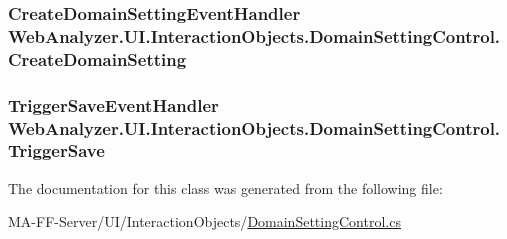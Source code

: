 \subsubsection[{Create\+Domain\+Setting}]{\setlength{\rightskip}{0pt plus 5cm}Create\+Domain\+Setting\+Event\+Handler Web\+Analyzer.\+U\+I.\+Interaction\+Objects.\+Domain\+Setting\+Control.\+Create\+Domain\+Setting}\label{class_web_analyzer_1_1_u_i_1_1_interaction_objects_1_1_domain_setting_control_aff18f63d7e7cb4b8c5d62b881bfc685c}
\hypertarget{class_web_analyzer_1_1_u_i_1_1_interaction_objects_1_1_domain_setting_control_a1daa9c774e823427b39110bc42ff0ccd}{}
\subsubsection[{Trigger\+Save}]{\setlength{\rightskip}{0pt plus 5cm}Trigger\+Save\+Event\+Handler Web\+Analyzer.\+U\+I.\+Interaction\+Objects.\+Domain\+Setting\+Control.\+Trigger\+Save}\label{class_web_analyzer_1_1_u_i_1_1_interaction_objects_1_1_domain_setting_control_a1daa9c774e823427b39110bc42ff0ccd}


The documentation for this class was generated from the following file\+:\begin{DoxyCompactItemize}
\item 
M\+A-\/\+F\+F-\/\+Server/\+U\+I/\+Interaction\+Objects/\hyperlink{_domain_setting_control_8cs}{Domain\+Setting\+Control.\+cs}\end{DoxyCompactItemize}
